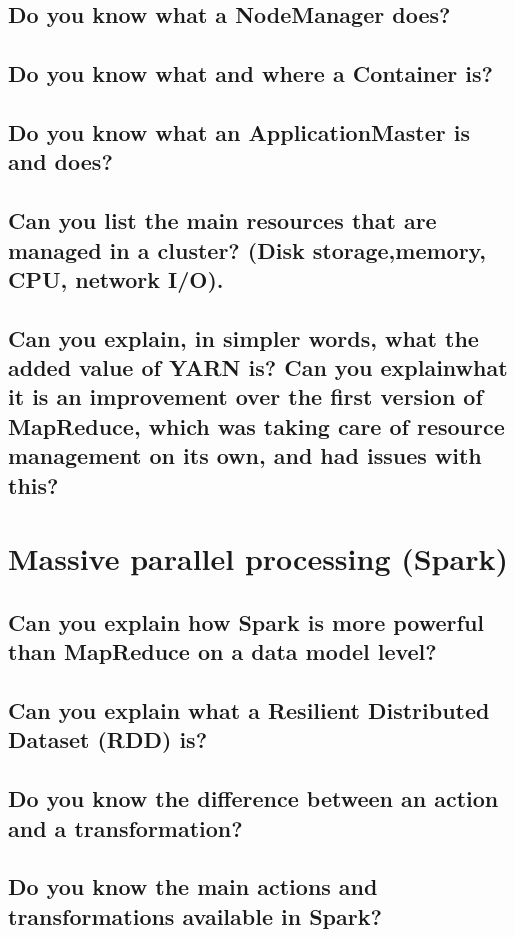 \documentclass{article}
\begin{document}
\subsection{Do you know what a NodeManager does?}
\subsection{Do you know what and where a Container is?}
\subsection{Do you know what an ApplicationMaster is and does?}
\subsection{Can you list the main resources that are managed in a cluster? (Disk storage,memory, CPU, network I/O).}
\subsection{Can you explain, in simpler words, what the added value of YARN is? Can you explainwhat it is an improvement over the first version of MapReduce, which was taking care of resource management on its own, and had issues with this?}

\pagebreak

\section{Massive parallel processing (Spark)}
\subsection{Can you explain how Spark is more powerful than MapReduce on a data model level?}
\subsection{Can you explain what a Resilient Distributed Dataset (RDD) is?}
\subsection{Do you know the difference between an action and a transformation?}
\subsection{Do you know the main actions and transformations available in Spark?}
\end{document}
